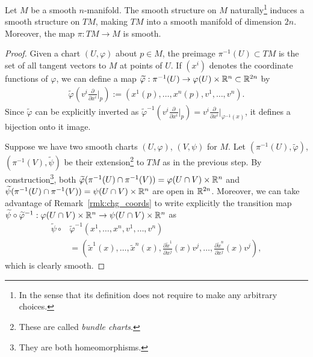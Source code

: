 \begin{theorem}\label{thm:tgbdlsmoothmfld}
  Let $M$ be a smooth $n$-manifold.
  The smooth structure on $M$ naturally\footnote{In the sense that its definition does not require to make any arbitrary choices.} induces a smooth structure on $TM$, making $TM$ into a smooth manifold of dimension $2n$.
  Moreover, the map $\pi: TM \to M$ is smooth.
\end{theorem}
\begin{proof}
  Given a chart $(U,\varphi)$ about $p\in M$, the preimage $\pi^{-1}(U) \subset TM$ is the set of all tangent vectors to $M$ at points of $U$.
  If $(x^i)$ denotes the coordinate functions of $\varphi$, we can define a map $\widetilde\varphi : \pi^{-1}(U) \to \varphi(U)\times\mathbb{R}^n \subset \mathbb{R}^{2n}$ by
  \begin{align}\label{eq:nat_coords}
    \widetilde\varphi\left(v^i \frac{\partial}{\partial x^i}\Big|_p\right) := \left(x^1(p), \ldots, x^n(p), v^1, \ldots, v^n\right).
  \end{align}
  Since $\widetilde\varphi$ can be explicitly inverted as $\widetilde\varphi^{-1}\left(v^i \frac{\partial}{\partial x^i}\Big|_p\right) = v^i \frac{\partial}{\partial x^i}\Big|_{\varphi^{-1}(x)}$, it defines a bijection onto it image.

  Suppose we have two smooth charts $(U,\varphi)$, $(V,\psi)$ for $M$.
  Let $(\pi^{-1}(U),\widetilde\varphi)$, $(\pi^{-1}(V),\widetilde\psi)$ be their extension\footnote{These are called \emph{bundle charts}.} to $TM$ as in the previous step.
  By construction\footnote{They are both homeomorphisms.}, both $\widetilde\varphi(\pi^{-1}(U)\cap\pi^{-1}(V)) = \varphi(U\cap V)\times\mathbb{R}^n$ and $\widetilde\psi(\pi^{-1}(U)\cap\pi^{-1}(V)) = \psi(U\cap V)\times\mathbb{R}^n$ are open in $\mathbb{R}^{2n}$.
  Moreover, we can take advantage of Remark~\ref{rmk:chg_coords} to write explicitly the transition map  $\widetilde\psi\circ\widetilde\varphi^{-1}: \varphi(U\cap V)\times\mathbb{R}^n \to \psi(U\cap V)\times\mathbb{R}^n$ as
  \begin{align}
    \widetilde\psi\circ&\widetilde\varphi^{-1}\left(x^1, \ldots, x^n, v^1, \ldots, v^n\right) \\
    &=\left(\widetilde x^1(x),\ldots, \widetilde x^n(x), \frac{\partial \widetilde x^1}{\partial x^j}(x) v^j, \ldots, \frac{\partial \widetilde x^n}{\partial x^j}(x) v^j\right),
  \end{align}
  which is clearly smooth.


\end{proof}

